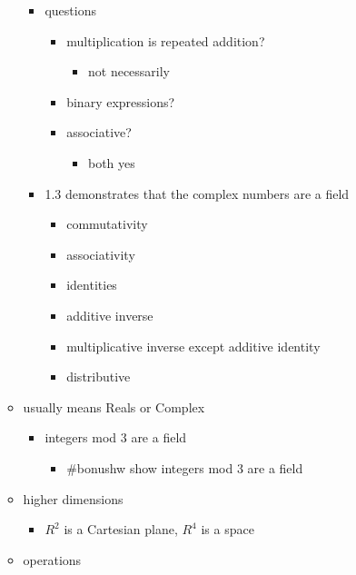 \documentclass[letterpaper]{article}
\begin{document}
\begin{itemize}
\begin{itemize}
\begin{itemize}
\item questions

\begin{itemize}
\item multiplication is repeated addition?

\begin{itemize}
\item not necessarily
\end{itemize}

\item binary expressions?
\item associative?

\begin{itemize}
\item both yes
\end{itemize}
\end{itemize}

\item 1.3 demonstrates that the complex numbers are a field

\begin{itemize}
\item commutativity
\item associativity
\item identities
\item additive inverse
\item multiplicative inverse except additive identity
\item distributive
\end{itemize}
\end{itemize}

\item usually means Reals or Complex

\begin{itemize}
\item integers mod 3 are a field

\begin{itemize}
\item \#bonushw show integers mod 3 are a field
\end{itemize}
\end{itemize}

\item higher dimensions

\begin{itemize}
\item \(R^2\) is a Cartesian plane, \(R^4\) is a space
\end{itemize}

\item operations


\end{itemize}
\end{itemize}
\end{document}
